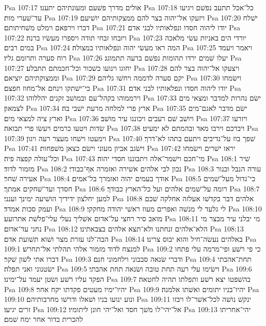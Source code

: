 Psa 107:17  אולים מדרך פשׁעם ומעונתיהם יתענו׃
Psa 107:18  כל־אכל תתעב נפשׁם ויגיעו עד־שׁערי מות׃
Psa 107:19  ויזעקו אל־יהוה בצר להם ממצקותיהם יושׁיעם׃
Psa 107:20  ישׁלח דברו וירפאם וימלט משׁחיתותם׃
Psa 107:21  יודו ליהוה חסדו ונפלאותיו לבני אדם׃
Psa 107:22  ויזבחו זבחי תודה ויספרו מעשׂיו ברנה׃
Psa 107:23  יורדי הים באניות עשׂי מלאכה במים רבים׃
Psa 107:24  המה ראו מעשׂי יהוה ונפלאותיו במצולה׃
Psa 107:25  ויאמר ויעמד רוח סערה ותרומם גליו׃
Psa 107:26  יעלו שׁמים ירדו תהומות נפשׁם ברעה תתמוגג׃
Psa 107:27  יחוגו וינועו כשׁכור וכל־חכמתם תתבלע׃
Psa 107:28  ויצעקו אל־יהוה בצר להם וממצוקתיהם יוציאם׃
Psa 107:29  יקם סערה לדממה ויחשׁו גליהם׃
Psa 107:30  וישׂמחו כי־ישׁתקו וינחם אל־מחוז חפצם׃
Psa 107:31  יודו ליהוה חסדו ונפלאותיו לבני אדם׃
Psa 107:32  וירממוהו בקהל־עם ובמושׁב זקנים יהללוהו׃
Psa 107:33  ישׂם נהרות למדבר ומצאי מים לצמאון׃
Psa 107:34  ארץ פרי למלחה מרעת ישׁבי בה׃
Psa 107:35  ישׂם מדבר לאגם־מים וארץ ציה למצאי מים׃
Psa 107:36  ויושׁב שׁם רעבים ויכוננו עיר מושׁב׃
Psa 107:37  ויזרעו שׂדות ויטעו כרמים ויעשׂו פרי תבואה׃
Psa 107:38  ויברכם וירבו מאד ובהמתם לא ימעיט׃
Psa 107:39  וימעטו וישׁחו מעצר רעה ויגון׃
Psa 107:40  שׁפך בוז על־נדיבים ויתעם בתהו לא־דרך׃
Psa 107:41  וישׂגב אביון מעוני וישׂם כצאן משׁפחות׃
Psa 107:42  יראו ישׁרים וישׂמחו וכל־עולה קפצה פיה׃
Psa 107:43  מי־חכם וישׁמר־אלה ויתבוננו חסדי יהוה׃
Psa 108:1  שׁיר מזמור לדוד׃
Psa 108:2  נכון לבי אלהים אשׁירה ואזמרה אף־כבודי׃
Psa 108:3  עורה הנבל וכנור אעירה שׁחר׃
Psa 108:4  אודך בעמים יהוה ואזמרך בל־אמים׃
Psa 108:5  כי־גדול מעל־שׁמים חסדך ועד־שׁחקים אמתך׃
Psa 108:6  רומה על־שׁמים אלהים ועל כל־הארץ כבודך׃
Psa 108:7  למען יחלצון ידידיך הושׁיעה ימינך וענני׃
Psa 108:8  אלהים דבר בקדשׁו אעלזה אחלקה שׁכם ועמק סכות אמדד׃
Psa 108:9  לי גלעד לי מנשׁה ואפרים מעוז ראשׁי יהודה מחקקי׃
Psa 108:10  מואב סיר רחצי על־אדום אשׁליך נעלי עלי־פלשׁת אתרועע׃
Psa 108:11  מי יבלני עיר מבצר מי נחני עד־אדום׃
Psa 108:12  הלא־אלהים זנחתנו ולא־תצא אלהים בצבאתינו׃
Psa 108:13  הבה־לנו עזרת מצר ושׁוא תשׁועת אדם׃
Psa 108:14  באלהים נעשׂה־חיל והוא יבוס צרינו׃
Psa 109:1  למנצח לדוד מזמור אלהי תהלתי אל־תחרשׁ׃
Psa 109:2  כי פי רשׁע ופי־מרמה עלי פתחו דברו אתי לשׁון שׁקר׃
Psa 109:3  ודברי שׂנאה סבבוני וילחמוני חנם׃
Psa 109:4  תחת־אהבתי ישׂטנוני ואני תפלה׃
Psa 109:5  וישׂימו עלי רעה תחת טובה ושׂנאה תחת אהבתי׃
Psa 109:6  הפקד עליו רשׁע ושׂטן יעמד על־ימינו׃
Psa 109:7  בהשׁפטו יצא רשׁע ותפלתו תהיה לחטאה׃
Psa 109:8  יהיו־ימיו מעטים פקדתו יקח אחר׃
Psa 109:9  יהיו־בניו יתומים ואשׁתו אלמנה׃
Psa 109:10  ונוע ינועו בניו ושׁאלו ודרשׁו מחרבותיהם׃
Psa 109:11  ינקשׁ נושׁה לכל־אשׁר־לו ויבזו זרים יגיעו׃
Psa 109:12  אל־יהי־לו משׁך חסד ואל־יהי חונן ליתומיו׃
Psa 109:13  יהי־אחריתו להכרית בדור אחר ימח שׁמם׃
